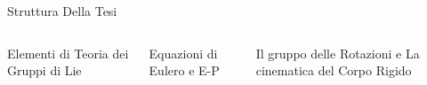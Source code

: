 \documentclass[unknownkeysallowed]{beamer}
\begin{document}
\begin{frame}{Struttura Della Tesi}
\begin{columns}[c] %

\begin{block}{Elementi di Teoria dei Gruppi di Lie}
\end{block}
\vfill
\phantom{1}

\phantom{1}

\phantom{1}

\phantom{1}

\phantom{1}

\phantom{1}

\phantom{1}

{\begin{alertblock}{Equazioni di Eulero e E-P}
\end{alertblock}}

\begin{center}
{\begin{exampleblock}{Il gruppo delle Rotazioni e La cinematica del Corpo Rigido}
\end{exampleblock}}
\end{center}


\end{columns}
\end{frame}
\end{document}
